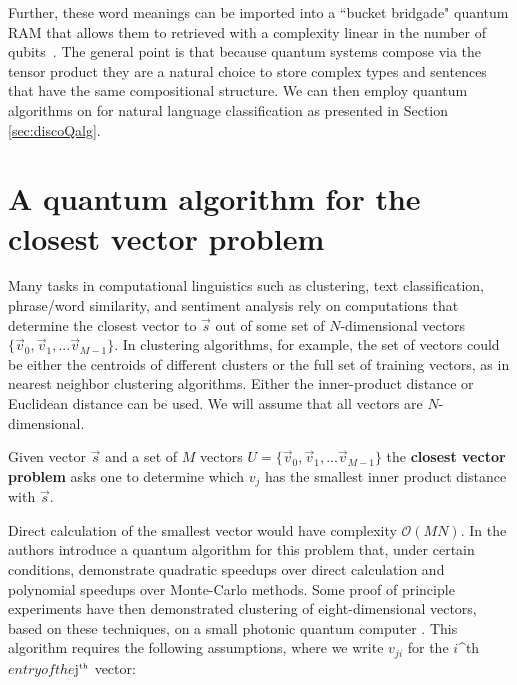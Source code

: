 Further, these word meanings can be imported into a ``bucket bridgade" quantum RAM that allows them to retrieved with a complexity linear in the number of qubits~\cite{giovannetti2008quantum}. The general point is that because quantum systems compose via the tensor product they are a natural choice to store complex types and sentences that have the same compositional structure. We can then employ quantum algorithms on for natural language classification as presented in Section \ref{sec:discoQalg}.

\section{A quantum algorithm for the closest vector problem}
\label{sec:qalg}

Many tasks in computational linguistics such as clustering, text classification, phrase/word similarity, and sentiment analysis rely on computations that determine the closest vector to $\vec{s}$ out of some set of $N$-dimensional vectors $\{\vec{v}_0,\vec{v}_1,...\vec{v}_{M-1}\}$. In clustering algorithms, for example, the set of vectors could be either the centroids of different clusters or the full set of training vectors, as in nearest neighbor clustering algorithms. Either the inner-product distance or Euclidean distance can be used. We will assume that all vectors are $N$-dimensional.
\begin{definition}
Given vector $\vec{s}$ and a set of $M$ vectors $U = \{\vec{v}_0,\vec{v}_1,...\vec{v}_{M-1}\}$ the \textbf{closest vector problem} asks one to determine which $v_j$ has the smallest inner product distance with $\vec{s}$.
\end{definition}
Direct calculation of the smallest vector would have complexity $\mathcal{O}(MN)$.  In \cite{wiebe2014quantum} the authors introduce a quantum algorithm for this problem that, under certain conditions, demonstrate quadratic speedups over direct calculation and polynomial speedups over Monte-Carlo methods. Some proof of principle experiments have then demonstrated clustering of eight-dimensional vectors, based on these techniques, on a small photonic quantum computer \cite{cai2015entanglement}. This algorithm requires the following assumptions, where we write $v_{ji}$ for the $i$^{\tiny\mbox{th}}$ entry of the $j$^{\tiny\mbox{th}}$ vector:
